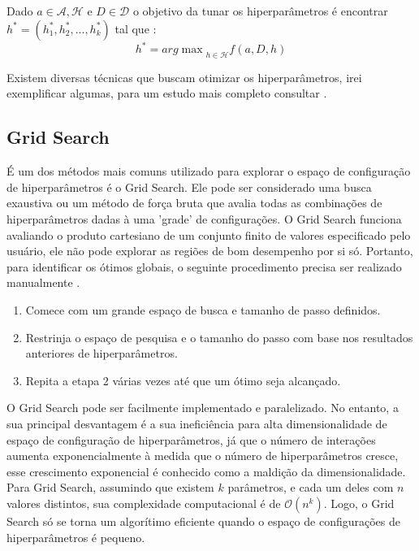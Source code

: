 Dado $a\in \mathcal{A},\mathcal{H}$ e $D\in \mathcal{D}$ o objetivo da tunar os hiperparâmetros é encontrar $h^*=(h_1^*,h_2^*,...,h_k^*)$ tal que :
\begin{equation}
    h^* = {arg\max}_{h\in\mathcal{H}} f(a,D,h)
\end{equation}

Existem diversas técnicas que buscam otimizar os hiperparâmetros, irei exemplificar algumas, para um estudo mais completo consultar \cite{hyper:op:theory,grid:book,neural:op}.
\subsection{Grid Search}
É um dos métodos mais comuns utilizado para explorar o espaço de configuração de hiperparâmetros é o Grid Search. Ele pode ser considerado uma busca exaustiva ou um método de força bruta que avalia todas as combinações de hiperparâmetros dadas à uma 'grade' de configurações. O Grid Search funciona avaliando o produto cartesiano de um conjunto finito de valores especificado pelo usuário, ele não pode explorar as regiões de bom desempenho por si só. Portanto, para identificar os ótimos globais, o seguinte procedimento precisa ser realizado manualmente \cite{grid:article,grid:book,grid:random:2}.

\begin{enumerate}
    \item Comece com um grande espaço de busca e tamanho de passo definidos. 
    \item Restrinja o espaço de pesquisa e o tamanho do passo com base nos resultados anteriores de hiperparâmetros. 
    \item Repita a etapa 2 várias vezes até que um ótimo seja alcançado.
\end{enumerate}

O Grid Search pode ser facilmente implementado e paralelizado. No entanto, a sua principal desvantagem é a sua ineficiência para alta dimensionalidade de espaço de configuração de hiperparâmetros, já que o número de interações aumenta exponencialmente à medida que o número de hiperparâmetros cresce, esse crescimento exponencial é conhecido como a maldição da dimensionalidade. Para Grid Search, assumindo que existem $k$ parâmetros, e cada um deles com $n$ valores distintos, sua complexidade computacional é de $\mathcal{O}(n^k)$. Logo, o Grid Search só se torna um algorítimo eficiente quando o espaço de configurações de hiperparâmetros é pequeno.

